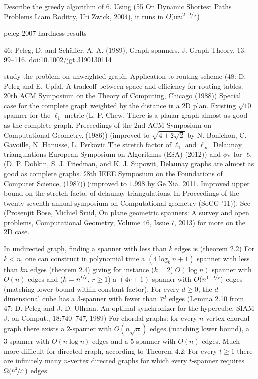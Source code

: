 Describe the greedy algorithm of 6. Using (55 On Dynamic Shortest Paths Problems Liam Roditty, Uri
Zwick, 2004), it runs in $O(\alpha n^{2+\nicefrac{1}{\alpha}})$

peleg 2007 hardness results

46: Peleg, D. and Schäffer, A. A. (1989), Graph spanners. J. Graph Theory, 13: 99–116.
doi:10.1002/jgt.3190130114

study the problem on unweighted graph. Application to routing scheme (48: D. Peleg and E. Upfal, A
tradeoff between space and efficiency for routing tables. 20th ACM Symposium on the Theory of
Computing, Chicago (1988))
Special case for the complete graph weighted by the distance in a 2D plan. Existing $\sqrt{10}$
spanner for the $\ell_1$ metric (L. P. Chew, There is a planar graph almost as good as the complete
graph.  Proceedings of the 2nd ACM Symposium on Computational Geometry, (1986)) (improved to
$\sqrt{4+2\sqrt{2}}$ by N. Bonichon, C. Gavoille, N. Hanusse, L. Perkovic The stretch factor of
$\ell_1$ and $\ell_{\infty}$ Delaunay triangulations European Symposium on Algorithms (ESA) (2012))
and $\phi \pi$ for $\ell_2$ (D. P. Dobkin, S. J. Friedman, and K. J. Supowit, Delaunay graphs are
almost as good as complete graphs. 28th IEEE Symposium on the Foundations of Computer Science,
(1987)) (improved to $1.998$ by Ge Xia. 2011. Improved upper bound on the stretch factor of delaunay
triangulations. In Proceedings of the twenty-seventh annual symposium on Computational geometry
(SoCG '11)). See (Prosenjit Bose, Michiel Smid, On plane geometric spanners: A survey and open
problems, Computational Geometry, Volume 46, Issue 7, 2013) for more on the 2D case.

In undirected graph, finding a spanner with less than $k$ edges is \NPc{} (theorem 2.2)
For $k<n$, one can construct in polynomial time a $(4\log_k n +1)$ spanner with less than $kn$ edges
(theorem 2.4) giving for instance ($k=2$) $O(\log n)$ spanner with $O(n)$ edges and
($k=n^{\nicefrac{1}{r}}$, $r\geq 1$) a $(4r+1)$ spanner with $O(n^{1+\nicefrac{1}{r}})$ edges
(matching lower bound within constant factor). For every $d \geq 0$, the $d$-dimensional cube has a
$3$-spanner with fewer than $7\time 2^d$ edges (Lemma 2.10 from 47: D. Peleg and J. D. Ullman. An
optimal synchronizer for the hypercube. SIAM J. on Comput., 18:740–747, 1989)
For chordal graphs: for every $n$-vertex chordal graph there exists a $2$-spanner with
$O(n\sqrt{n})$ edges (matching lower bound), a $3$-spanner with $O(n \log n)$ edges and a $5$-spanner
with $O(n)$ edges.
Much more difficult for directed graph, according to Theorem 4.2: For every $t \geq 1$ there are
infinitely many $n$-vertex directed graphs for which every $t$-spanner requires
$\Omega(\nicefrac{n^2}{t^2})$ edges.

